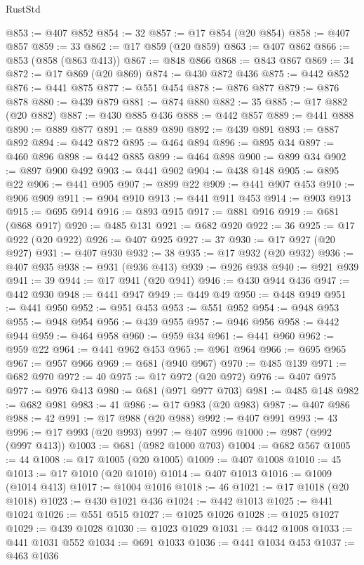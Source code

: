 \begin{lexlean}{RustStd}
\begin{coremodule}
@853 := @407 @852
@854 := 32
@857 := @17 @854 (@20 @854)
@858 := @407 @857
@859 := 33
@862 := @17 @859 (@20 @859)
@863 := @407 @862
@866 := @853 (@858 (@863 @413))
@867 := @848 @866
@868 := @843 @867
@869 := 34
@872 := @17 @869 (@20 @869)
@874 := @430 @872 @436
@875 := @442 @852
@876 := @441 @875
@877 := @551 @454
@878 := @876 @877
@879 := @876 @878
@880 := @439 @879
@881 := @874 @880
@882 := 35
@885 := @17 @882 (@20 @882)
@887 := @430 @885 @436
@888 := @442 @857
@889 := @441 @888
@890 := @889 @877
@891 := @889 @890
@892 := @439 @891
@893 := @887 @892
@894 := @442 @872
@895 := @464 @894
@896 := @895 @34
@897 := @460 @896
@898 := @442 @885
@899 := @464 @898
@900 := @899 @34
@902 := @897 @900 @492
@903 := @441 @902
@904 := @438 @148
@905 := @895 @22
@906 := @441 @905
@907 := @899 @22
@909 := @441 @907 @453
@910 := @906 @909
@911 := @904 @910
@913 := @441 @911 @453
@914 := @903 @913
@915 := @695 @914
@916 := @893 @915
@917 := @881 @916
@919 := @681 (@868 @917)
@920 := @485 @131
@921 := @682 @920
@922 := 36
@925 := @17 @922 (@20 @922)
@926 := @407 @925
@927 := 37
@930 := @17 @927 (@20 @927)
@931 := @407 @930
@932 := 38
@935 := @17 @932 (@20 @932)
@936 := @407 @935
@938 := @931 (@936 @413)
@939 := @926 @938
@940 := @921 @939
@941 := 39
@944 := @17 @941 (@20 @941)
@946 := @430 @944 @436
@947 := @442 @930
@948 := @441 @947
@949 := @449 @49
@950 := @448 @949
@951 := @441 @950
@952 := @951 @453
@953 := @551 @952
@954 := @948 @953
@955 := @948 @954
@956 := @439 @955
@957 := @946 @956
@958 := @442 @944
@959 := @464 @958
@960 := @959 @34
@961 := @441 @960
@962 := @959 @22
@964 := @441 @962 @453
@965 := @961 @964
@966 := @695 @965
@967 := @957 @966
@969 := @681 (@940 @967)
@970 := @485 @139
@971 := @682 @970
@972 := 40
@975 := @17 @972 (@20 @972)
@976 := @407 @975
@977 := @976 @413
@980 := @681 (@971 @977 @703)
@981 := @485 @148
@982 := @682 @981
@983 := 41
@986 := @17 @983 (@20 @983)
@987 := @407 @986
@988 := 42
@991 := @17 @988 (@20 @988)
@992 := @407 @991
@993 := 43
@996 := @17 @993 (@20 @993)
@997 := @407 @996
@1000 := @987 (@992 (@997 @413))
@1003 := @681 (@982 @1000 @703)
@1004 := @682 @567
@1005 := 44
@1008 := @17 @1005 (@20 @1005)
@1009 := @407 @1008
@1010 := 45
@1013 := @17 @1010 (@20 @1010)
@1014 := @407 @1013
@1016 := @1009 (@1014 @413)
@1017 := @1004 @1016
@1018 := 46
@1021 := @17 @1018 (@20 @1018)
@1023 := @430 @1021 @436
@1024 := @442 @1013
@1025 := @441 @1024
@1026 := @551 @515
@1027 := @1025 @1026
@1028 := @1025 @1027
@1029 := @439 @1028
@1030 := @1023 @1029
@1031 := @442 @1008
@1033 := @441 @1031 @552
@1034 := @691 @1033
@1036 := @441 @1034 @453
@1037 := @463 @1036

\end{coremodule}
\end{lexlean}

